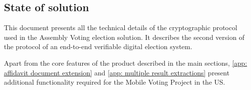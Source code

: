 \subsection{State of solution}
This document presents all the technical details of the cryptographic protocol used in the Assembly Voting election solution. It describes the second version of the protocol of an end-to-end verifiable digital election system. 

Apart from the core features of the product described in the main sections, \cref{app: affidavit document extension} and \cref{app: multiple result extractions} present additional functionality required for the Mobile Voting Project \cite{Tusk} in the US.
